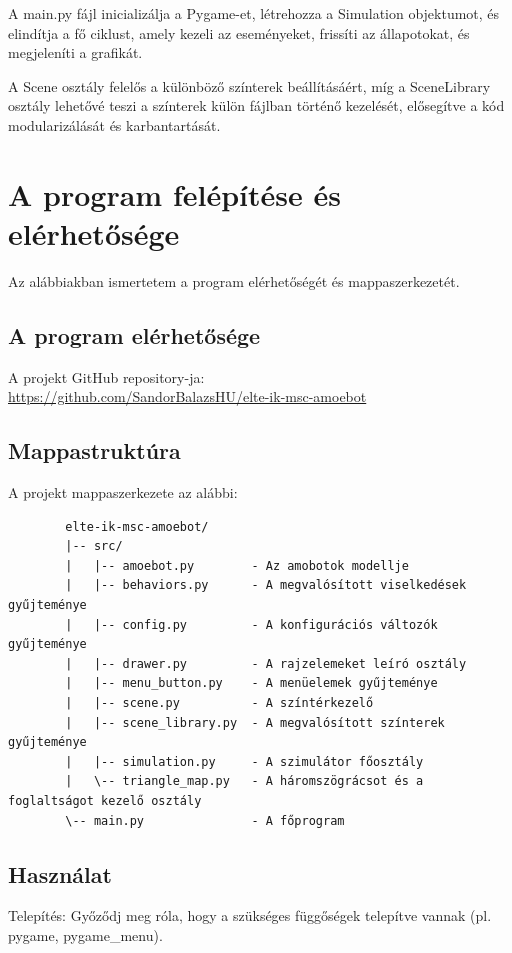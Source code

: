 \documentclass[	
  noindent
]{elteikthesis}[2024/04/26]
\begin{document}
A main.py fájl inicializálja a Pygame-et, létrehozza a Simulation objektumot, és elindítja a fő ciklust, amely kezeli az eseményeket, frissíti az állapotokat, és megjeleníti a grafikát.

A Scene osztály felelős a különböző színterek beállításáért, míg a SceneLibrary osztály lehetővé teszi a színterek külön fájlban történő kezelését, elősegítve a kód modularizálását és karbantartását.

  \section{A program felépítése és elérhetősége}
    Az alábbiakban ismertetem a program elérhetőségét és mappaszerkezetét.

    \subsection{A program elérhetősége}
      A projekt GitHub repository-ja:
      \\
      \url{https://github.com/SandorBalazsHU/elte-ik-msc-amoebot}

    \subsection*{Mappastruktúra}
      A projekt mappaszerkezete az alábbi:
      \begin{verbatim}
        elte-ik-msc-amoebot/
        |-- src/
        |   |-- amoebot.py        - Az amobotok modellje
        |   |-- behaviors.py      - A megvalósított viselkedések gyűjteménye
        |   |-- config.py         - A konfigurációs változók gyűjteménye
        |   |-- drawer.py         - A rajzelemeket leíró osztály
        |   |-- menu_button.py    - A menüelemek gyűjteménye
        |   |-- scene.py          - A színtérkezelő
        |   |-- scene_library.py  - A megvalósított színterek gyűjteménye
        |   |-- simulation.py     - A szimulátor főosztály
        |   \-- triangle_map.py   - A háromszögrácsot és a foglaltságot kezelő osztály
        \-- main.py               - A főprogram
        \end{verbatim}

    \subsection{Használat}

      Telepítés: Győződj meg róla, hogy a szükséges függőségek telepítve vannak (pl. pygame, pygame_menu).
      
\end{document}
